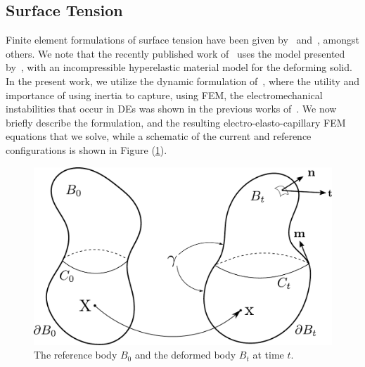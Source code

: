 \documentclass[final,authoryear,3p,times,twocolumn]{elsarticle}
\begin{document}
\subsection{Surface Tension}

Finite element formulations of surface tension have been given by~\citet{saksonoCM2006} and~\cite{javiliCMAME2010}, amongst others.  We note that the recently published work of~\citet{henannSM2014} uses the model presented by~\citet{saksonoCM2006}, with an incompressible hyperelastic material model for the deforming solid.  In the present work, we utilize the dynamic formulation of~\citet{saksonoCM2006a}, where the utility and importance of using inertia to capture, using FEM, the electromechanical instabilities that occur in DEs was shown in the previous works of~\citet{parkIJSS2012,parkCMAME2013,parkSM2013}.  We now briefly describe the formulation, and the resulting electro-elasto-capillary FEM equations that we solve, while a schematic of the current and reference configurations is shown in Figure (\ref{ref}).

\begin{figure} \begin{center}
\includegraphics[scale=0.4]{pics/refdef.pdf}
\caption{The reference body $B_0$ and the deformed body $B_t$ at time $t$.}
\label{ref} \end{center}
\end{figure}
\end{document}
